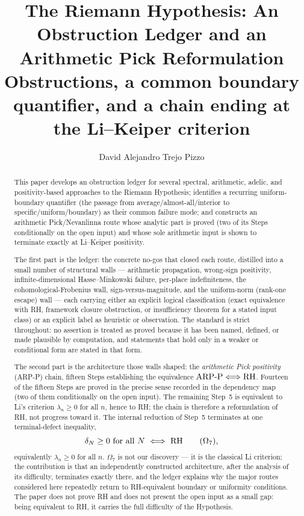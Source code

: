 \documentclass[11pt]{amsart}
\title[An Obstruction Ledger and a Pick Reformulation of RH]{The Riemann Hypothesis:
An Obstruction Ledger and an Arithmetic Pick Reformulation\\[0.3em]
\normalsize\textmd{Obstructions, a common boundary quantifier, and a chain ending at the Li--Keiper
criterion}}
\author{David Alejandro Trejo Pizzo}
\theoremstyle{definition}
\theoremstyle{remark}
\theoremstyle{definition}
\begin{document}
\maketitle

\begin{abstract}
This paper develops an obstruction ledger for several spectral, arithmetic, adelic, and
positivity-based approaches to the Riemann Hypothesis; identifies a recurring uniform-boundary quantifier
(the passage from average/almost-all/interior to specific/uniform/boundary) as their common failure mode;
and constructs an arithmetic Pick/Nevanlinna route whose analytic part is proved (two of its Steps
conditionally on the open input) and whose sole
arithmetic input is shown to terminate exactly at Li--Keiper positivity.

The first part is the ledger: the concrete no-gos that closed each route, distilled into a small number
of structural walls --- arithmetic propagation, wrong-sign positivity, infinite-dimensional
Hasse--Minkowski failure, per-place indefiniteness, the cohomological-Frobenius wall,
sign-versus-magnitude, and the uniform-norm (rank-one escape) wall --- each carrying either an explicit logical
classification (exact equivalence with RH, framework closure obstruction, or insufficiency theorem for a
stated input class) or an explicit label as heuristic or observation. The standard is strict throughout: no assertion is treated as proved because it has
been named, defined, or made plausible by computation, and statements that hold only in a weaker or
conditional form are stated in that form.

The second part is the architecture those walls shaped: the \emph{arithmetic Pick positivity} (ARP-P)
chain, fifteen Steps establishing the equivalence $\textnormal{ARP-P}\Longleftrightarrow\textnormal{RH}$.
Fourteen of the fifteen Steps are proved in the precise sense recorded in the dependency map (two of them
conditionally on the open input). The remaining Step~5 is equivalent to Li's criterion $\lambda_n\ge0$
for all $n$, hence to RH; the chain is therefore a reformulation of RH, not progress toward it. The
internal reduction of Step~5 terminates at one terminal-defect inequality,
\[
   \delta_N\ge0\ \text{for all }N\ \Longleftrightarrow\ \textnormal{RH}\qquad(\Omega_7),
\]
equivalently $\lambda_n\ge0$ for all $n$. $\Omega_7$ is not our discovery --- it is the classical Li
criterion; the contribution is that an independently constructed architecture, after the analysis of
its difficulty, terminates exactly there, and the ledger explains why the major routes considered here
repeatedly return to RH-equivalent boundary or uniformity conditions. The paper does not prove
RH and does not present the open input as a small gap: being equivalent to RH, it carries the full
difficulty of the Hypothesis.


\end{abstract}
\end{document}
